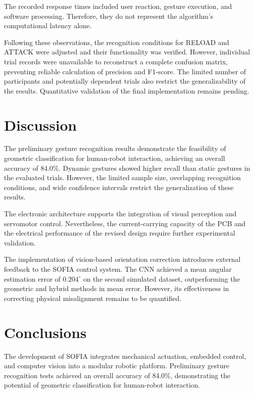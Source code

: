 \documentclass[lettersize,journal]{IEEEtran}
\begin{document}
	The recorded response times
	included user reaction, gesture execution, and software
	processing. Therefore, they do not represent the algorithm's
	computational latency alone.

	Following these observations,
	the recognition conditions for RELOAD and ATTACK were adjusted
	and their functionality was verified. However, individual
	trial records were unavailable to reconstruct a complete
	confusion matrix, preventing reliable calculation of
	precision and F1-score. The limited number of participants
	and potentially dependent trials also restrict the
	generalizability of the results. Quantitative validation
	of the final implementation remains pending.

		
	\section{Discussion}
	\label{sec:discussion}

	The preliminary gesture recognition results demonstrate the
	feasibility of geometric classification for human-robot
	interaction, achieving an overall accuracy of 84.0\%.
	Dynamic gestures showed higher recall than static gestures
	in the evaluated trials. However, the limited sample size,
	overlapping recognition conditions, and wide confidence
	intervals restrict the generalization of these results.

	The electronic architecture supports the integration of
	visual perception and servomotor control. Nevertheless,
	the current-carrying capacity of the PCB and the electrical
	performance of the revised design require further
	experimental validation.

	The implementation of vision-based orientation correction
	introduces external feedback to the SOFIA control system.
	The CNN achieved a mean angular estimation error of
	$0.204^\circ$ on the second simulated dataset, outperforming
	the geometric and hybrid methods in mean error. However,
	its effectiveness in correcting physical misalignment remains to be quantified.

	
	
	\section{Conclusions}
	\label{sec:conclusions}

	The development of SOFIA integrates mechanical actuation,
	embedded control, and computer vision into a modular
	robotic platform. Preliminary gesture recognition tests
	achieved an overall accuracy of 84.0\%, demonstrating
	the potential of geometric classification for human-robot
	interaction.
\end{document}
